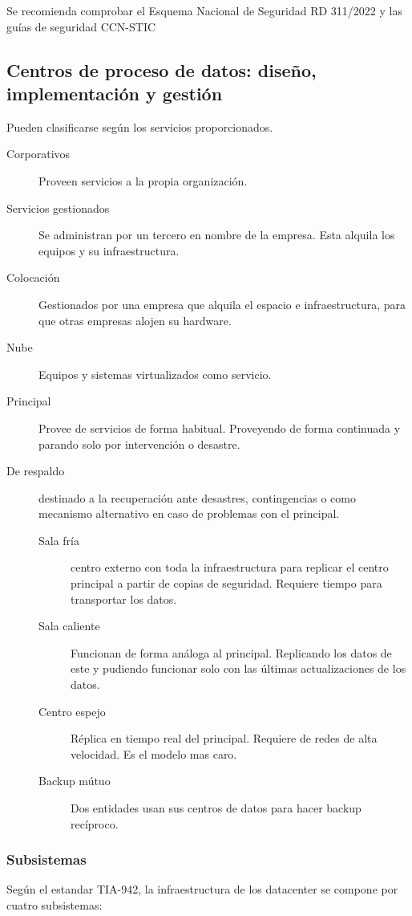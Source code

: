 Se recomienda comprobar el Esquema Nacional de Seguridad RD 311/2022 y las guías de seguridad CCN-STIC

\subsection{Centros de proceso de datos: diseño, implementación y gestión}

Pueden clasificarse según los servicios proporcionados.

\begin{description}
    \item[Corporativos] Proveen servicios a la propia organización.
    \item[Servicios gestionados] Se administran por un tercero en nombre de la empresa. Esta alquila los equipos y su infraestructura.
    \item[Colocación] Gestionados por una empresa que alquila el espacio e infraestructura, para que otras empresas alojen su hardware.
    \item[Nube] Equipos y sistemas virtualizados como servicio.
    \item[Principal] Provee de servicios de forma habitual. Proveyendo de forma continuada y parando solo por intervención o desastre.
    \item[De respaldo] destinado a la recuperación ante desastres, contingencias o como mecanismo alternativo en caso de problemas con el principal.
    \begin{description}
        \item[Sala fría] centro externo con toda la infraestructura para replicar el centro principal a partir de copias de seguridad. Requiere tiempo para transportar los datos.
        \item[Sala caliente] Funcionan de forma análoga al principal. Replicando los datos de este y pudiendo funcionar solo con las últimas actualizaciones de los datos.
        \item[Centro espejo] Réplica en tiempo real del principal. Requiere de redes de alta velocidad. Es el modelo mas caro.
        \item[Backup mútuo] Dos entidades usan sus centros de datos para hacer backup recíproco.
    \end{description}
\end{description}

\subsubsection{Subsistemas}
Según el estandar TIA-942, la infraestructura de los datacenter se compone por cuatro subsistemas:


